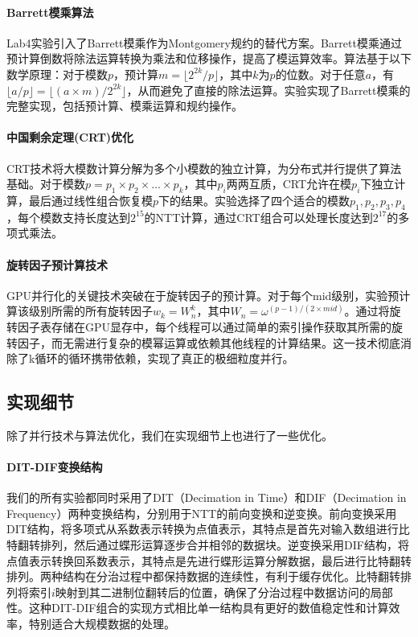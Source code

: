\documentclass[a4paper]{article}
\begin{document}
\paragraph{Barrett模乘算法} Lab4实验引入了Barrett模乘作为Montgomery规约的替代方案。Barrett模乘通过预计算倒数将除法运算转换为乘法和位移操作，提高了模运算效率。算法基于以下数学原理：对于模数$p$，预计算$m = \lfloor 2^{2k}/p \rfloor$，其中$k$为$p$的位数。对于任意$a$，有$\lfloor a/p \rfloor = \lfloor (a \times m)/2^{2k} \rfloor$，从而避免了直接的除法运算。实验实现了Barrett模乘的完整实现，包括预计算、模乘运算和规约操作。

\paragraph{中国剩余定理(CRT)优化} CRT技术将大模数计算分解为多个小模数的独立计算，为分布式并行提供了算法基础。对于模数$p = p_1 \times p_2 \times \ldots \times p_k$，其中$p_i$两两互质，CRT允许在模$p_i$下独立计算，最后通过线性组合恢复模$p$下的结果。实验选择了四个适合的模数$p_1, p_2, p_3, p_4$，每个模数支持长度达到$2^{15}$的NTT计算，通过CRT组合可以处理长度达到$2^{17}$的多项式乘法。

\paragraph{旋转因子预计算技术} GPU并行化的关键技术突破在于旋转因子的预计算。对于每个mid级别，实验预计算该级别所需的所有旋转因子$w_k = W_n^k$，其中$W_n = \omega^{(p-1)/(2 \times mid)}$。通过将旋转因子表存储在GPU显存中，每个线程可以通过简单的索引操作获取其所需的旋转因子，而无需进行复杂的模幂运算或依赖其他线程的计算结果。这一技术彻底消除了k循环的循环携带依赖，实现了真正的极细粒度并行。

\subsection{实现细节}

除了并行技术与算法优化，我们在实现细节上也进行了一些优化。

\paragraph{DIT-DIF变换结构} 我们的所有实验都同时采用了DIT（Decimation in Time）和DIF（Decimation in Frequency）两种变换结构，分别用于NTT的前向变换和逆变换。前向变换采用DIT结构，将多项式从系数表示转换为点值表示，其特点是首先对输入数组进行比特翻转排列，然后通过蝶形运算逐步合并相邻的数据块。逆变换采用DIF结构，将点值表示转换回系数表示，其特点是先进行蝶形运算分解数据，最后进行比特翻转排列。两种结构在分治过程中都保持数据的连续性，有利于缓存优化。比特翻转排列将索引$i$映射到其二进制位翻转后的位置，确保了分治过程中数据访问的局部性。这种DIT-DIF组合的实现方式相比单一结构具有更好的数值稳定性和计算效率，特别适合大规模数据的处理。
\end{document}
